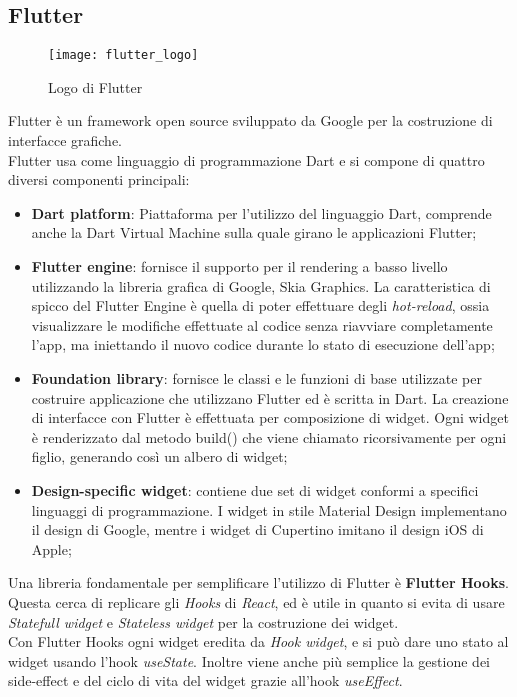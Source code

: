 \subsection{Flutter}
\begin{figure}[ht]
    \centering
    \texttt{[image: flutter\_logo]}
    \caption{Logo di Flutter}
\end{figure}
Flutter è un framework open source sviluppato da Google per la costruzione di interfacce grafiche.\\
Flutter usa come linguaggio di programmazione Dart e si compone di quattro diversi componenti principali:
\begin{itemize}
    \item \textbf{Dart platform}: Piattaforma per l'utilizzo del linguaggio Dart, comprende anche la Dart Virtual Machine sulla quale girano le applicazioni Flutter;
    \item \textbf{Flutter engine}: fornisce il supporto per il rendering a basso livello utilizzando la libreria grafica di Google, Skia Graphics. La caratteristica di spicco del Flutter Engine è quella di poter effettuare degli \textit{hot-reload}, ossia visualizzare le modifiche effettuate al codice senza riavviare completamente l'app, ma iniettando il nuovo codice durante lo stato di esecuzione dell'app;
    \item \textbf{Foundation library}: fornisce le classi e le funzioni di base utilizzate per costruire applicazione che utilizzano Flutter ed è scritta in Dart. La creazione di interfacce con Flutter è effettuata per composizione di widget. Ogni widget è renderizzato dal metodo build() che viene chiamato ricorsivamente per ogni figlio, generando così un albero di widget;
    \item \textbf{Design-specific widget}: contiene due set di widget conformi a specifici linguaggi di programmazione. I widget in stile Material Design implementano il design di Google, mentre i widget di Cupertino imitano il design iOS di Apple;
\end{itemize}

Una libreria fondamentale per semplificare l'utilizzo di Flutter è \textbf{Flutter Hooks}. Questa cerca di replicare gli \textit{Hooks} di \textit{React}, ed è utile in quanto si evita di usare \textit{Statefull widget} e \textit{Stateless widget} per la costruzione dei widget. \\
Con Flutter Hooks ogni widget eredita da \textit{Hook widget}, e si può dare uno stato al widget usando l'hook \textit{useState}. Inoltre viene anche più semplice la gestione dei side-effect e del ciclo di vita del widget grazie all'hook \textit{useEffect}.

